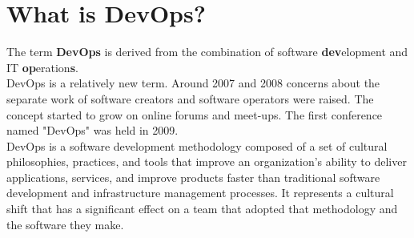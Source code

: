 \section{What is DevOps?} The term \textbf{DevOps} is derived from the combination of software \textbf{dev}elopment and IT \textbf{op}eration\textbf{s}.\\
DevOps is a relatively new term. Around 2007 and 2008 concerns about the separate work of software creators and software operators were raised. The concept started to grow on online forums and meet-ups. The first conference named "DevOps" was held in 2009.\cite{devops-wiki}\\
DevOps is a software development methodology composed of a set of cultural philosophies, practices, and tools that improve an organization's ability to deliver applications, services, and improve products faster than traditional software development and infrastructure management processes. It represents a cultural shift that has a significant effect on a team that adopted that methodology and the software they make.\cite{devops-atl}


